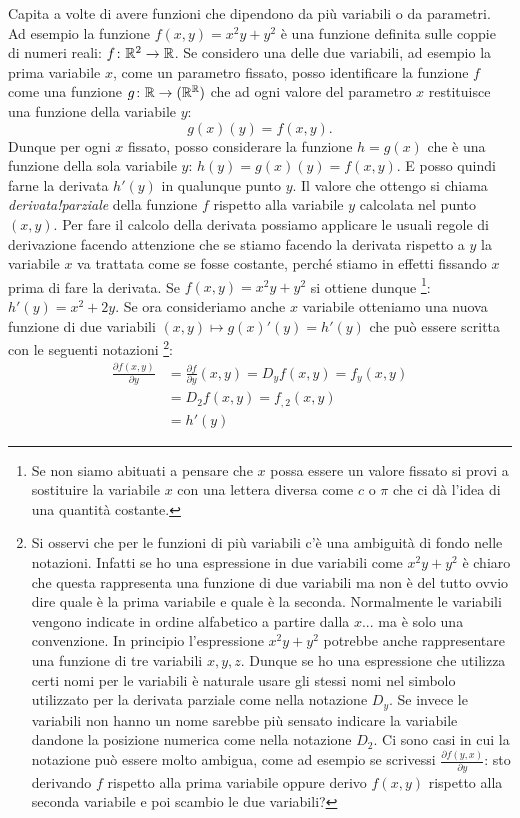 Capita a volte di avere funzioni che dipendono da più variabili o da parametri.
Ad esempio la funzione $f(x,y) = x^2y+y^2$ è una funzione definita 
sulle coppie di numeri reali: $f\colon {\mathbb R}^2\to {\mathbb R}$.
Se considero una delle due variabili, ad esempio la prima variabile $x$, 
come un parametro fissato, posso identificare la funzione $f$ come 
una funzione $g\colon {\mathbb R} \to ({\mathbb R}^{\mathbb R})$ 
che ad ogni valore del parametro $x$ restituisce una funzione 
della variabile $y$:
\[
  g(x)(y) = f(x,y).
\]
Dunque per ogni $x$ fissato, posso considerare la funzione $h=g(x)$
che è una funzione della sola variabile $y$: $h(y) = g(x)(y) = f(x,y)$.  
E posso quindi farne la derivata $h'(y)$ in qualunque punto $y$. 
Il valore che ottengo si chiama \emph{derivata!parziale}%
%
della funzione $f$ rispetto alla variabile $y$ calcolata nel punto $(x,y)$.
Per fare il calcolo della derivata possiamo applicare le usuali regole di 
derivazione facendo attenzione che se stiamo 
facendo la derivata rispetto a $y$ la variabile $x$ va trattata come se 
fosse costante, perché stiamo in effetti fissando $x$ prima di fare la derivata.
Se $f(x,y) = x^2y+y^2$ si ottiene dunque%
\footnote{Se non siamo abituati a pensare che $x$ possa essere un valore fissato 
si provi a sostituire la variabile $x$ con una lettera diversa come $c$ o $\pi$ che ci dà l'idea 
di una quantità costante.}:
$h'(y) = x^2 + 2y$.
Se ora consideriamo anche $x$ variabile otteniamo una nuova funzione di due 
variabili $(x,y)\mapsto g(x)'(y) = h'(y)$ che può essere scritta 
con le seguenti notazioni%
\footnote{%
Si osservi che per le funzioni di più variabili c'è una ambiguità di fondo nelle notazioni.
Infatti se ho una espressione in due variabili come $x^2 y + y^2$ è chiaro 
che questa rappresenta una funzione di due variabili ma non è del tutto ovvio dire quale 
è la prima variabile e quale è la seconda. 
Normalmente le variabili vengono indicate in ordine alfabetico a partire dalla $x$... 
ma è solo una convenzione. In principio l'espressione $x^2y + y^2$ 
potrebbe anche rappresentare una funzione di tre variabili $x,y,z$. 
Dunque se ho una espressione che utilizza certi nomi per le variabili è naturale 
usare gli stessi nomi nel simbolo utilizzato per la derivata parziale come 
nella notazione $D_y$.
Se invece le variabili non hanno un nome sarebbe più sensato indicare la variabile dandone 
la posizione numerica come nella notazione $D_2$.
Ci sono casi in cui la notazione può essere molto ambigua, come ad esempio 
se scrivessi $\frac{\partial f(y,x)}{\partial y}$: 
sto derivando $f$ rispetto alla prima variabile oppure derivo $f(x,y)$ rispetto alla seconda 
variabile e poi scambio le due variabili?
}:
\begin{align*}
\frac{\partial f(x,y)}{\partial y} 
&= \frac{\partial f}{\partial y}(x,y)
= D_y f(x,y)
= f_y (x,y) \\
&= D_2 f(x,y) = f_{,2} (x,y) \\
&= h'(y)
\end{align*}

